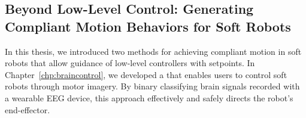 \subsection{Beyond Low-Level Control: Generating Compliant Motion Behaviors for Soft Robots}
In this thesis, we introduced two methods for achieving compliant motion in soft robots that allow guidance of low-level controllers with setpoints. In Chapter~\ref{chp:braincontrol}, we developed a  that enables users to control soft robots through motor imagery. By binary classifying brain signals recorded with a wearable \gls{EEG} device, this approach effectively and safely directs the robot’s end-effector.

